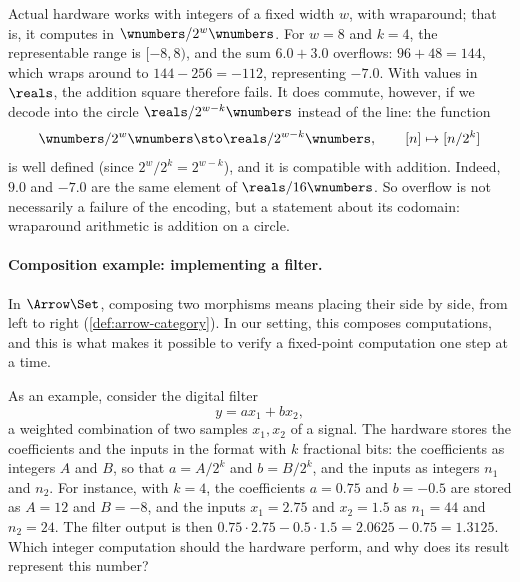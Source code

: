 \begin{example}
    \label{exa:fixed-point-overflow}
    Actual hardware works with integers of a fixed width $w$, with wraparound; that is, it computes in $\wnumbers/2^w\wnumbers$.
    For $w = 8$ and $k = 4$, the representable range is $[-8, 8)$, and the sum $6.0 + 3.0$ overflows: $96 + 48 = 144$, which wraps around to $144 - 256 = -112$, representing $-7.0$.
    With values in $\reals$, the addition square therefore fails.
    It does commute, however, if we decode into the circle $\reals / 2^{w-k}\wnumbers$ instead of the line:
    the function
    \begin{equation}
        \wnumbers/2^w\wnumbers \sto \reals / 2^{w-k}\wnumbers,
        \qquad
        [n] \mapsto [n / 2^k]
    \end{equation}
    is well defined (since $2^w / 2^k = 2^{w-k}$), and it is compatible with addition.
    Indeed, $9.0$ and $-7.0$ are the same element of $\reals / 16\wnumbers$.
    So overflow is not necessarily a failure of the encoding, but a statement about its codomain: wraparound arithmetic is addition on a circle.
\end{example}

\paragraph{Composition example: implementing a filter.}
In $\Arrow\Set$, composing two morphisms means placing their  side by side, from left to right (\cref{def:arrow-category}).
In our setting, this composes computations, and this is what makes it possible to verify a fixed-point computation one step at a time.

As an example, consider the digital filter
\begin{equation}
    y = a x_1 + b x_2,
\end{equation}
a weighted combination of two samples $x_1, x_2$ of a signal.
The hardware stores the coefficients and the inputs in the format with $k$ fractional bits: the coefficients as integers $A$ and $B$, so that $a = A/2^k$ and $b = B/2^k$, and the inputs as integers $n_1$ and $n_2$.
For instance, with $k = 4$, the coefficients $a = 0.75$ and $b = -0.5$ are stored as $A = 12$ and $B = -8$, and the inputs $x_1 = 2.75$ and $x_2 = 1.5$ as $n_1 = 44$ and $n_2 = 24$.
The filter output is then $0.75 \cdot 2.75 - 0.5 \cdot 1.5 = 2.0625 - 0.75 = 1.3125$.
Which integer computation should the hardware perform, and why does its result represent this number?

